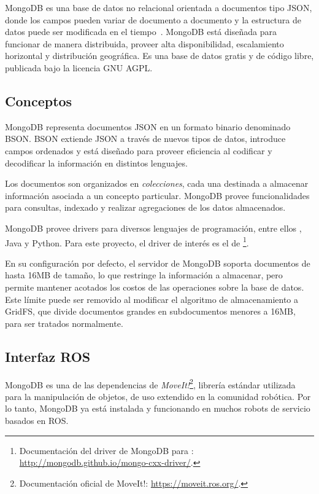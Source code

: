 MongoDB es una base de datos no relacional orientada a documentos tipo JSON, donde los campos pueden variar de documento a documento y la estructura de datos puede ser modificada en el tiempo~\cite{MongoDB}. MongoDB está diseñada para funcionar de manera distribuida, proveer alta disponibilidad, escalamiento horizontal y distribución geográfica. Es una base de datos gratis y de código libre, publicada bajo la licencia GNU AGPL.

\subsection{Conceptos}

MongoDB representa documentos JSON en un formato binario denominado BSON. BSON extiende JSON a través de nuevos tipos de datos, introduce campos ordenados y está diseñado para proveer eficiencia al codificar y decodificar la información en distintos lenguajes. 

Los documentos son organizados en \textit{colecciones}, cada una destinada a almacenar información asociada a un concepto particular. MongoDB provee funcionalidades para consultas, indexado y realizar agregaciones de los datos almacenados.

MongoDB provee drivers para diversos lenguajes de programación, entre ellos \CC, Java y Python. Para este proyecto, el driver de interés es el de \footnote{Documentación del driver de MongoDB para \CC:  \url{http://mongodb.github.io/mongo-cxx-driver/}.}.

En su configuración por defecto, el servidor de MongoDB soporta documentos de hasta 16MB de tamaño, lo que restringe la información a almacenar, pero permite mantener acotados los costos de las operaciones sobre la base de datos. Este límite puede ser removido al modificar el algoritmo de almacenamiento a GridFS, que divide documentos grandes en subdocumentos menores a 16MB, para ser tratados normalmente.

\subsection{Interfaz ROS}

MongoDB es una de las dependencias de \textit{MoveIt!}\footnote{Documentación oficial de MoveIt!: \url{https://moveit.ros.org/}.}, librería estándar utilizada para la manipulación de objetos, de uso extendido en la comunidad robótica. Por lo tanto, MongoDB ya está instalada y funcionando en muchos robots de servicio basados en ROS. 

